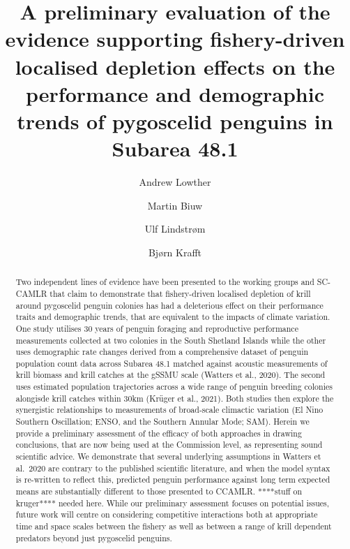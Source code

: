 \documentclass[]{elsarticle} %
\begin{document}
\begin{frontmatter}

  \title{A preliminary evaluation of the evidence supporting
fishery-driven localised depletion effects on the performance and
demographic trends of pygoscelid penguins in Subarea 48.1}
    \author[Norwegian Polar Institute]{Andrew Lowther}
    \author[Institute of Marine Research (Tromsø)]{Martin
Biuw}
    \author[Institute of Marine Research (Tromsø)]{Ulf
Lindstrøm}
    \author[Institute of Marine Research (Bergen)]{Bjørn
Krafft}
      \address[Norwegian Polar Institute]{Norwegian Polar Institute,
Research Department, Fram Centre, Hjalmar Johansensgata 14, Tromsø,
Norway, 9297}
    \address[Institute of Marine Research (Tromsø)]{Institute of Marine
Research, Tromsø 9296, Norway}
    \address[Institute of Marine Research (Bergen)]{Institute of Marine
Research, Nordnesgaten 50, 5005 Bergen, Norway}
  
  \begin{abstract}
  Two independent lines of evidence have been presented to the working
  groups and SC-CAMLR that claim to demonstrate that fishery-driven
  localised depletion of krill around pygoscelid penguin colonies has
  had a deleterious effect on their performance traits and demographic
  trends, that are equivalent to the impacts of climate variation. One
  study utilises 30 years of penguin foraging and reproductive
  performance measurements collected at two colonies in the South
  Shetland Islands while the other uses demographic rate changes derived
  from a comprehensive dataset of penguin population count data across
  Subarea 48.1 matched against acoustic measurements of krill biomass
  and krill catches at the gSSMU scale (Watters et al., 2020). The
  second uses estimated population trajectories across a wide range of
  penguin breeding colonies alongisde krill catches within 30km (Krüger
  et al., 2021). Both studies then explore the synergistic relationships
  to measurements of broad-scale climactic variation (El Nino Southern
  Oscillation; ENSO, and the Southern Annular Mode; SAM). Herein we
  provide a preliminary assessment of the efficacy of both approaches in
  drawing conclusions, that are now being used at the Commission level,
  as representing sound scientific advice. We demonstrate that several
  underlying assumptions in Watters et al.~2020 are contrary to the
  published scientific literature, and when the model syntax is
  re-written to reflect this, predicted penguin performance against long
  term expected means are substantially different to those presented to
  CCAMLR. ****stuff on kruger**** needed here. While our preliminary
  assessment focuses on potential issues, future work will centre on
  considering competitive interactions both at appropriate time and
  space scales between the fishery as well as between a range of krill
  dependent predators beyond just pygoscelid penguins.
  \end{abstract}
  
 \end{frontmatter}
\end{document}
